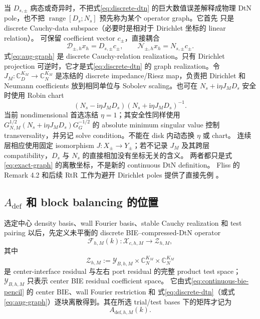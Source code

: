 \documentclass[UTF8,fontset=fandol,11pt,a4paper]{ctexart}
\newcommand{\ii}{\mathrm{i}}
\newcommand{\cF}{\mathcal F}
\newcommand{\cD}{\mathcal D}
\newcommand{\cN}{\mathcal N}
\begin{document}
当 $D_{s,\pm}$ 病态或奇异时，不把式\eqref{eq:discrete-dtn} 的巨大数值误差解释成物理
DtN pole，也不把 $\operatorname{range}[D_s;N_s]$ 预先称为某个 operator graph。它首先
只是 discrete Cauchy-data subspace（必要时是相对于 Dirichlet 坐标的 linear relation）。
可保留 coefficient vector $c_\pm$，直接耦合
\begin{equation}
  \cD_{\pm,h}x_h=D_{s,\pm}c_\pm,
  \qquad
  \cN_{\pm,h}x_h=N_{s,\pm}c_\pm.
  \label{eq:aug-graph}
\end{equation}
式\eqref{eq:aug-graph} 是 discrete Cauchy-relation realization。只有 Dirichlet projection
可逆时，它才是式\eqref{eq:discrete-dtn} 的 graph realization。令
$J_M:\mathbb C_D^{K_M}\to\mathbb C_N^{K_M}$ 是冻结的 discrete impedance/Riesz map，负责把
Dirichlet 和 Neumann coefficients 放到相同单位与 Sobolev scaling。也可在
$N_s+\ii\eta J_MD_s$ 安全时使用 Robin chart
\[
  (N_s-\ii\eta J_MD_s)(N_s+\ii\eta J_MD_s)^{-1}.
\]
当前 nondimensional 首选冻结 $\eta=1$；其安全性同样使用
$G_{N,M}^{1/2}(N_s+\ii\eta J_MD_s)G_G^{-1/2}$ 的 absolute minimum singular value
控制 transversality，并另记 solve condition。不能在 disk 内动态换 $\eta$ 或 chart。
连续层相应使用固定 isomorphism $J:X_\pm\to Y_\pm$；若不记录 $J_M$ 及其跨层
compatibility，$D_s$ 与 $N_s$ 的直接相加没有坐标无关的含义。
两者都只是式\eqref{eq:exact-graph} 的离散坐标，不是新的 continuous DtN definition。
Fliss 的 Remark 4.2 和后续 RtR 工作为避开 Dirichlet poles 提供了直接先例
\cite{Fliss2013,Fliss2015}。

\subsection{\texorpdfstring{$A_{\mathrm{def}}$}{A-def} 和 block balancing 的位置}

选定中心 density basis、wall Fourier basis、stable Cauchy realization 和 test pairing
以后，先定义未平衡的 discrete BIE--compressed-DtN operator
\begin{equation}
  \cF_{h,M}(k):\mathcal X_{c,h,M}\longrightarrow\mathcal Z_{h,M},
  \label{eq:discrete-f}
\end{equation}
其中
\[
  \mathcal Z_{h,M}:=\mathcal Y_{B,h,M}
  \times\mathbb C_N^{K_M}\times\mathbb C_N^{K_M}
\]
是 center-interface residual 与左右 port residual 的完整 product test space；
$\mathcal Y_{B,h,M}$ 只表示 center BIE residual coefficient space。
它由式\eqref{eq:continuous-bie-pencil} 的 center BIE、wall Fourier restriction 和
式\eqref{eq:discrete-dtn}（或式\eqref{eq:aug-graph}）逐块离散得到。其在所选 trial/test
bases 下的矩阵才记为
\[
  A_{\mathrm{def},h,M}(k).
\]
\end{document}

